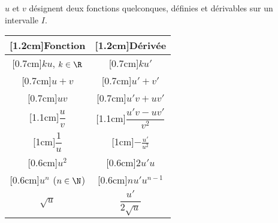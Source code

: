 \documentclass[12pt]{article}
\begin{document}
\noindent
$u$ et $v$ désignent deux fonctions quelconques, définies et
dérivables sur un intervalle $I$. 

\begin{center}
\begin{tabular}{|c|c|}\hline
\raisebox{0.4cm}[1.2cm]{Fonction} &
\raisebox{0.4cm}[1.2cm]{Dérivée} 
\tabularnewline\hline

\raisebox{0.1cm}[0.7cm]{$ku$, $k\in\R$} & 
\raisebox{0.1cm}[0.7cm]{$ku'$} 
\\\hline

\raisebox{0.1cm}[0.7cm]{$u+v$} & 
\raisebox{0.1cm}[0.7cm]{$u'+v'$}  
\\\hline

\raisebox{0.1cm}[0.7cm]{$uv$} & 
\raisebox{0.1cm}[0.7cm]{$u'v+uv'$}  
\\\hline

\raisebox{0.3cm}[1.1cm]{$\dfrac{u}{v}$} & 
\raisebox{0.3cm}[1.1cm]{$\dfrac{u'v-uv'}{v^2}$}  
\\\hline 
\raisebox{0.3cm}[1cm]{$\dfrac{1}{u}$} &
\raisebox{0.3cm}[1cm]{$-\frac{u'}{u^2}$} \\\hline
%
\raisebox{0.1cm}[0.6cm]{$u^2$} & 
\raisebox{0.1cm}[0.6cm]{$2u'u$} \\\hline
%
\raisebox{0.1cm}[0.6cm]{$u^n$ ($n\in\N$)} & 
\raisebox{0.1cm}[0.6cm]{$nu'u^{n-1}$} \\\hline
%
$\sqrt{u}$ & $\dfrac{u'}{2\sqrt{u}}$ \\\hline
%
\end{tabular}
\end{center}
\end{document}

